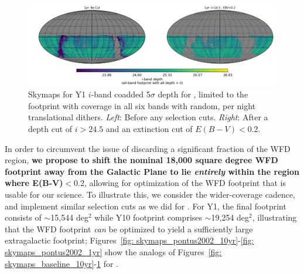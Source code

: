 \begin{figure}[H]
	\vspace*{2em}
	\centering\includegraphics[width=\linewidth,trim={30 40 40 40},clip=false]{figures/lss_final_footprint_skymap_baseline2018a_nside256_RandomDitherPerNight_1yr_iband.png}
	\vspace*{1em}
	\caption{Skymaps for Y1 $i$-band coadded 5$\sigma$ depth for , limited to the footprint with coverage in all six bands with random, per night translational dithers. \textit{Left}: Before any selection cuts.  \textit{Right}: After a depth cut of $i>24.5$ and an extinction cut of $E(B-V)<0.2$.}
	\label{fig: skymaps_baseline_1yr}
\end{figure}

In order to circumvent the issue of discarding a significant fraction of the WFD region, {\bf we propose to shift the nominal 18,000 square degree WFD footprint away from the Galactic Plane to lie {\em entirely} within the region where E(B-V)$\mathbf{<0.2}$}, allowing for optimization of the WFD footprint that is usable for our science. To illustrate this, we consider the wider-coverage  cadence,  and implement similar selection cuts as we did for . For Y1, the final footprint consists of $\sim$15,544 deg$^2$ while Y10 footprint comprises $\sim$19,254 deg$^2$, illustrating that the WFD footprint {\em can} be optimized to yield a sufficiently large extragalactic footprint; Figures~\ref{fig: skymaps_pontus2002_10yr}-\ref{fig: skymaps_pontus2002_1yr}  show the analogs of Figures~\ref{fig: skymaps_baseline_10yr}-\ref{fig: skymaps_baseline_1yr} for .

